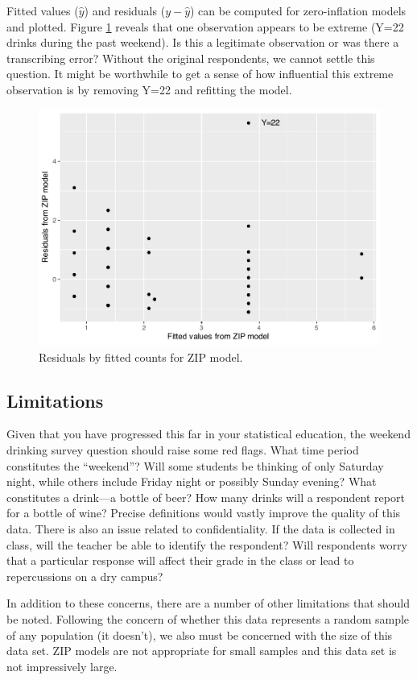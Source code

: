 \documentclass[
]{krantz}
\begin{document}
Fitted values (\(\hat{y}\)) and residuals (\(y-\hat{y}\)) can be computed for zero-inflation models and plotted. Figure \ref{fig:poisRes} reveals that one observation appears to be extreme (Y=22 drinks during the past weekend). Is this a legitimate observation or was there a transcribing error? Without the original respondents, we cannot settle this question. It might be worthwhile to get a sense of how influential this extreme observation is by removing Y=22 and refitting the model.

\begin{figure}

{\centering \includegraphics[width=0.6\linewidth]{bookdown-BeyondMLR_files/figure-latex/poisRes-1} 

}

\caption{Residuals by fitted counts for ZIP model.}\label{fig:poisRes}
\end{figure}

\hypertarget{limitations}{%
\subsection{Limitations}\label{limitations}}

Given that you have progressed this far in your statistical education, the weekend drinking survey question should raise some red flags. What time period constitutes the ``weekend''? Will some students be thinking of only Saturday night, while others include Friday night or possibly Sunday evening? What constitutes a drink---a bottle of beer? How many drinks will a respondent report for a bottle of wine? Precise definitions would vastly improve the quality of this data. There is also an issue related to confidentiality. If the data is collected in class, will the teacher be able to identify the respondent? Will respondents worry that a particular response will affect their grade in the class or lead to repercussions on a dry campus?

In addition to these concerns, there are a number of other limitations that should be noted. Following the concern of whether this data represents a random sample of any population (it doesn't), we also must be concerned with the size of this data set. ZIP models are not appropriate for small samples and this data set is not impressively large.
\end{document}
